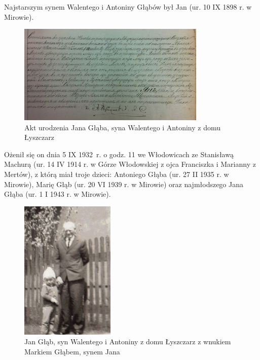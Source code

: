 Najstarszym synem Walentego i Antoniny Głąbów był Jan (ur. 10 IX 1898 r. w Mirowie).

\begin{figure}[!h]
\begin{center}
\includegraphics[width=0.8\textwidth]{zdjecia/akt_urodzenia_jana_glaba.jpg}
\caption[Akt urodzenia Jana Głąba]{Akt urodzenia Jana Głąba, syna Walentego i Antoniny z domu Łyszczarz}
\label{rys:akt_urodzenia_jana_glaba}
\end{center}
\end{figure}

Ożenił się on dnia 5 IX 1932~r. o godz. 11 we Włodowicach ze Stanisławą Machurą (ur. 14 IV 1914 r. w Górze Włodowskiej z ojca Franciszka i Marianny z Mertów), z którą miał troje dzieci: Antoniego Głąba (ur. 27 II 1935 r. w Mirowie), Marię Głąb (ur. 20 VI 1939 r. w Mirowie) oraz najmłodszego Jana Głąba (ur. 1 I 1943 r. w Mirowie).

\begin{figure}[!h]
\begin{center}
\includegraphics[width=0.4\textwidth]{zdjecia/jan_glab.jpg}
\caption[Jan Głąb z wnukiem Markiem Głąbem]{Jan Głąb, syn Walentego i Antoniny z domu Łyszczarz z wnukiem Markiem Głąbem, synem Jana}
\label{rys:jan_glab}
\end{center}
\end{figure}





